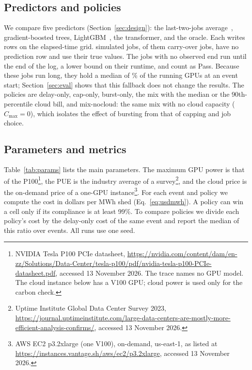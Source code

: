 \subsection{Predictors and policies}
We compare five predictors (Section~\ref{sec:design}): the last-two-jobs average~\cite{tsafrir07}, gradient-boosted trees, LightGBM~\cite{ke17}, the transformer, and the oracle. Each writes rows on the elapsed-time grid.
\MethNoPredJobs{} simulated jobs, \MethNoPredCarryJobs{} of them carry-over jobs, have no prediction row and use their true values. The \MethCensoredJobs{} jobs with no observed end run until the end of the log, a lower bound on their runtime, and count as Pass. Because these jobs run long, they hold a median of \MethNoPredGpuShareMedianPct\% of the running GPUs at an event start; Section~\ref{sec:eval} shows that this fallback does not change the results.
The policies are delay-only, cap-only, burst-only, the mix with the median or the 90th-percentile cloud bill, and mix-nocloud: the same mix with no cloud capacity ($C_{\max}=0$), which isolates the effect of bursting from that of capping and job choice.

\subsection{Parameters and metrics}
Table~\ref{tab:params} lists the main parameters. The maximum GPU power is that of the P100\footnote{\raggedright NVIDIA Tesla P100 PCIe datasheet, \url{https://nvidia.com/content/dam/en-zz/Solutions/Data-Center/tesla-p100/pdf/nvidia-tesla-p100-PCIe-datasheet.pdf}, accessed 13 November 2026. The trace names no GPU model. The cloud instance below has a V100 GPU; cloud power is used only for the carbon check.}, the PUE is the industry average of a survey\footnote{\raggedright Uptime Institute Global Data Center Survey 2023, \url{https://journal.uptimeinstitute.com/large-data-centers-are-mostly-more-efficient-analysis-confirms/}, accessed 13 November 2026.}, and the cloud price is the on-demand price of a one-GPU instance\footnote{\raggedright AWS EC2 p3.2xlarge (one V100), on-demand, us-east-1, as listed at \url{https://instances.vantage.sh/aws/ec2/p3.2xlarge}, accessed 13 November 2026.}.
For each event and policy we compute the cost in dollars per MWh shed (Eq.~\ref{eq:usdmwh}). A policy can win a cell only if its compliance is at least 99\%. To compare policies we divide each policy's cost by the delay-only cost of the same event and report the median of this ratio over events. All runs use one seed.


